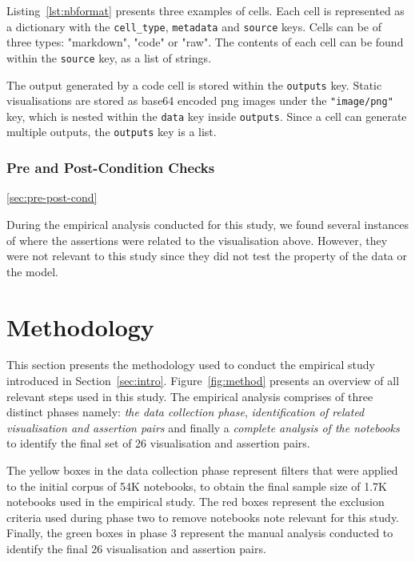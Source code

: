 \documentclass[acmsmall,screen,review,anonymous]{acmart}
\begin{document}
Listing~\ref{lst:nbformat} presents three examples of cells. Each cell is represented as a dictionary with the \texttt{cell\_type}, \texttt{metadata} and \texttt{source} keys. Cells can be of three types: "markdown", "code" or "raw". The contents of each cell can be found within the \texttt{source} key, as a list of strings.

The output generated by a code cell is stored within the \texttt{outputs} key. Static visualisations are stored as base64 encoded png images under the \texttt{"image/png"} key, which is nested within the \texttt{data} key inside \texttt{outputs}. Since a cell can generate multiple outputs, the \texttt{outputs} key is a list.

\subsubsection{Pre and Post-Condition Checks}\ref{sec:pre-post-cond}


During the empirical analysis conducted for this study, we found several instances of where the assertions were related to the visualisation above. However, they were not relevant to this study since they did not test the property of the data or the model. 

\section{Methodology}\label{sec:method}
This section presents the methodology used to conduct the empirical study introduced in Section~\ref{sec:intro}. Figure~\ref{fig:method} presents an overview of all relevant steps used in this study. The empirical analysis comprises of three distinct phases namely: \textit{the data collection phase}, \textit{identification of related visualisation and assertion pairs} and finally a \textit{complete analysis of the notebooks} to identify the final set of 26 visualisation and assertion pairs.

The yellow boxes in the data collection phase represent filters that were applied to the initial corpus of 54K notebooks, to obtain the final sample size of 1.7K notebooks used in the empirical study. The red boxes represent the exclusion criteria used during phase two to remove notebooks note relevant for this study. Finally, the green boxes in phase 3 represent the manual analysis conducted to identify the final 26 visualisation and assertion pairs.
\end{document}
